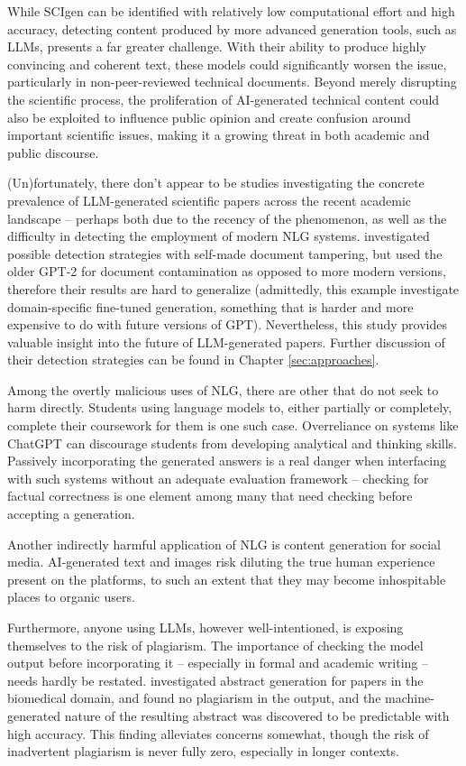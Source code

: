 While SCIgen can be identified with relatively low computational effort and high accuracy, detecting content produced by more advanced generation tools, such as LLMs, presents a far greater challenge.
With their ability to produce highly convincing and coherent text, these models could significantly worsen the issue, particularly in non-peer-reviewed technical documents.
Beyond merely disrupting the scientific process, the proliferation of AI-generated technical content could also be exploited to influence public opinion and create confusion around important scientific issues, making it a growing threat in both academic and public discourse.

(Un)fortunately, there don't appear to be studies investigating the concrete prevalence of LLM-generated scientific papers across the recent academic landscape -- perhaps both due to the recency of the phenomenon, as well as the difficulty in detecting the employment of modern NLG systems.
\citet{rodriguez2022cross} investigated possible detection strategies with self-made document tampering, but used the older GPT-2 for document contamination as opposed to more modern versions, therefore their results are hard to generalize
(admittedly, this example investigate domain-specific fine-tuned generation, something that is harder and more expensive to do with future versions of GPT).
Nevertheless, this study provides valuable insight into the future of LLM-generated papers. Further discussion of their detection strategies can be found in Chapter \ref{sec:approaches}.

Among the overtly malicious uses of NLG, there are other that do not seek to harm directly.
Students using language models to, either partially or completely, complete their coursework for them is one such case.
Overreliance on systems like ChatGPT can discourage students from developing analytical and thinking skills.
Passively incorporating the generated answers is a real danger when interfacing with such systems without an adequate evaluation framework -- checking for factual correctness is one element among many that need checking before accepting a generation.

Another indirectly harmful application of NLG is content generation for social media.
AI-generated text and images risk diluting the true human experience present on the platforms, to such an extent that they may become inhospitable places to organic users.

Furthermore, anyone using LLMs, however well-intentioned, is exposing themselves to the risk of plagiarism.
The importance of checking the model output before incorporating it -- especially in formal and academic writing -- needs hardly be restated.
\citet{gao2022comparing} investigated abstract generation for papers in the biomedical domain, and found no plagiarism in the output, and the machine-generated nature of the resulting abstract was discovered to be predictable with high accuracy.
This finding alleviates concerns somewhat, though the risk of inadvertent plagiarism is never fully zero, especially in longer contexts.
